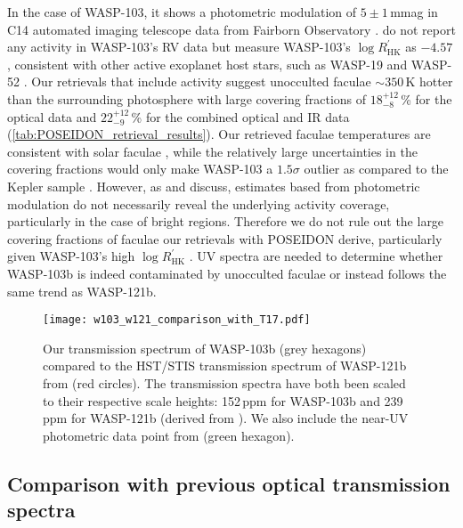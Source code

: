 \documentclass[twocolumn]{aastex63}
\begin{document}
In the case of WASP-103, it shows a photometric modulation of $5 \pm 1$\,mmag in C14 automated imaging telescope data from Fairborn Observatory \citep{Kreidberg2018}. \cite{Gillon2014} do not report any activity in WASP-103's RV data but \cite{Staab2017} measure WASP-103's $\log R^{'}_{\mathrm{HK}}$ as $-4.57$, consistent with other active exoplanet host stars, such as WASP-19 \citep{Sing2016} and WASP-52 \citep{Hebrard2013}. Our retrievals that include activity suggest unocculted faculae $\sim350$\,K hotter than the surrounding photosphere with large covering fractions of $18^{+12}_{-8}$\,\% for the optical data and $22^{+12}_{-9}$\,\% for the combined optical and IR data (\autoref{tab:POSEIDON_retrieval_results}). Our retrieved faculae temperatures are consistent with solar faculae \citep{Topka1997}, while the relatively large uncertainties in the covering fractions would only make WASP-103 a $1.5\sigma$ outlier as compared to the Kepler sample \citep{Rackham2019}. However, as \cite{Delrez2016} and \cite{Rackham2019} discuss, estimates based from photometric modulation do not necessarily reveal the underlying activity coverage, particularly in the case of bright regions. Therefore we do not rule out the large covering fractions of faculae our retrievals with POSEIDON derive, particularly given WASP-103's high $\log R^{'}_{\mathrm{HK}}$ \citep{Staab2017}. UV spectra are needed to determine whether WASP-103b is indeed contaminated by unocculted faculae or instead follows the same trend as WASP-121b.



\begin{figure}
    \centering
    \texttt{[image: w103\_w121\_comparison\_with\_T17.pdf]}
    \caption{Our transmission spectrum of WASP-103b (grey hexagons) compared to the HST/STIS transmission spectrum of WASP-121b from \protect\cite{Evans2018} (red circles). The transmission spectra have both been scaled to their respective scale heights: 152\,ppm for WASP-103b and 239\,ppm for WASP-121b (derived from \protect\citealt{Delrez2016}). We also include the near-UV photometric data point from \protect\cite{Turner2017} (green hexagon).}
    \label{fig:w121_comparison}
\end{figure}

\subsection{Comparison with previous optical transmission spectra}
\end{document}
